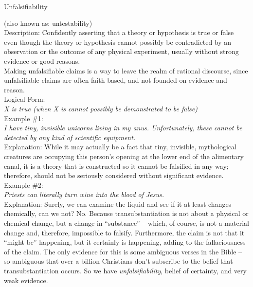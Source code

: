 \documentclass[a4paper,12pt,single,pdftex]{scrartcl}
\begin{document}
  

Unfalsifiability
    
      (also known as: untestability)
    \\

  
    
      
        Description: Confidently asserting that a theory or hypothesis is true or false even though the theory or hypothesis cannot possibly be contradicted by an observation or the outcome of any physical experiment, usually without strong evidence or good reasons.
      \\

      
        Making unfalsifiable claims is a way to leave the realm of rational discourse, since unfalsifiable claims are often faith-based, and not founded on evidence and reason.
      \\

      
        Logical Form:
      \\

      
        {\em X is true (when X is cannot possibly be demonstrated to be false)}
      \\

      
        Example \#1:
      \\

      
        {\em I have tiny, invisible unicorns living in my anus.  Unfortunately, these cannot be detected by any kind of scientific equipment.}
      \\

      
        Explanation: While it may actually be a fact that tiny, invisible, mythological creatures are occupying this person’s opening at the lower end of the alimentary canal, it is a theory that is constructed so it cannot be falsified in any way; therefore, should not be seriously considered without significant evidence.
      \\

      
        Example \#2:
      \\

      
        {\em Priests can literally turn wine into the blood of Jesus.}
      \\

      
        Explanation: Surely, we can examine the liquid and see if it at least changes chemically, can we not?  No.  Because transubstantiation is not about a physical or chemical change, but a change in “substance” -- which, of course, is not a material change and, therefore, impossible to falsify.  Furthermore, the claim is not that it “might be” happening, but it certainly is happening, adding to the fallaciousness of the claim.  The only evidence for this is some ambiguous verses in the Bible -- so ambiguous that over a billion Christians don’t subscribe to the belief that transubstantiation occurs.  So we have {\it unfalsifiability}, belief of certainty, and very weak evidence.
      \\
\end{document}
